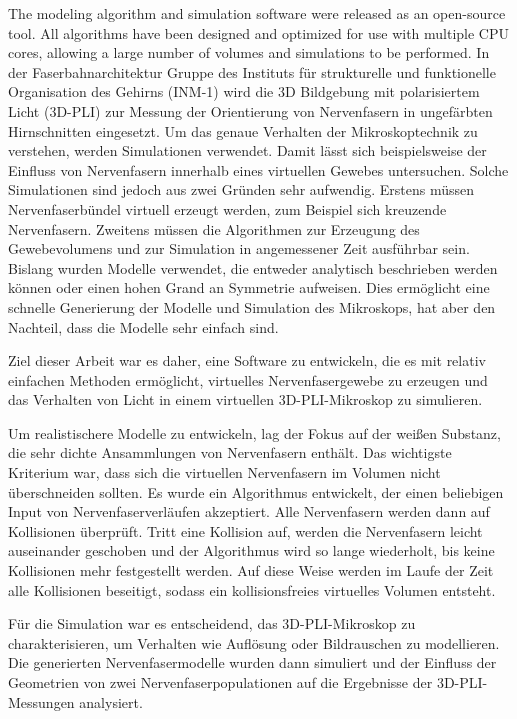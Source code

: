 The modeling algorithm and simulation software were released as an open-source tool.
All algorithms have been designed and optimized for use with multiple CPU cores, allowing a large number of volumes and simulations to be performed.
% 
% 
% 
% 
In der Faserbahnarchitektur Gruppe des Instituts für strukturelle und funktionelle Organisation des Gehirns (INM-1) wird die 3D Bildgebung mit polarisiertem Licht (3D-PLI) zur Messung der Orientierung von Nervenfasern in ungefärbten Hirnschnitten eingesetzt.
Um das genaue Verhalten der Mikroskoptechnik zu verstehen, werden Simulationen verwendet.
Damit lässt sich beispielsweise der Einfluss von Nervenfasern innerhalb eines virtuellen Gewebes untersuchen.
Solche Simulationen sind jedoch aus zwei Gründen sehr aufwendig.
Erstens müssen Nervenfaserbündel virtuell erzeugt werden, zum Beispiel sich kreuzende Nervenfasern.
Zweitens müssen die Algorithmen zur Erzeugung des Gewebevolumens und zur Simulation in angemessener Zeit ausführbar sein.
Bislang wurden Modelle verwendet, die entweder analytisch beschrieben werden können oder einen hohen Grand an Symmetrie aufweisen.
Dies ermöglicht eine schnelle Generierung der Modelle und Simulation des Mikroskops, hat aber den Nachteil, dass die Modelle sehr einfach sind. 

Ziel dieser Arbeit war es daher, eine Software zu entwickeln, die es mit relativ einfachen Methoden ermöglicht, virtuelles Nervenfasergewebe zu erzeugen und das Verhalten von Licht in einem virtuellen 3D-PLI-Mikroskop zu simulieren.

Um realistischere Modelle zu entwickeln, lag der Fokus auf der weißen Substanz, die sehr dichte Ansammlungen von Nervenfasern enthält.
Das wichtigste Kriterium war, dass sich die virtuellen Nervenfasern im Volumen nicht überschneiden sollten.
Es wurde ein Algorithmus entwickelt, der einen beliebigen Input von Nervenfaserverläufen akzeptiert.
Alle Nervenfasern werden dann auf Kollisionen überprüft.
Tritt eine Kollision auf, werden die Nervenfasern leicht auseinander geschoben und der Algorithmus wird so lange wiederholt, bis keine Kollisionen mehr festgestellt werden.
Auf diese Weise werden im Laufe der Zeit alle Kollisionen beseitigt, sodass ein kollisionsfreies virtuelles Volumen entsteht.

Für die Simulation war es entscheidend, das 3D-PLI-Mikroskop zu charakterisieren, um Verhalten wie Auflösung oder Bildrauschen zu modellieren.
Die generierten Nervenfasermodelle wurden dann simuliert und der Einfluss der Geometrien von zwei Nervenfaserpopulationen auf die Ergebnisse der 3D-PLI-Messungen analysiert.

